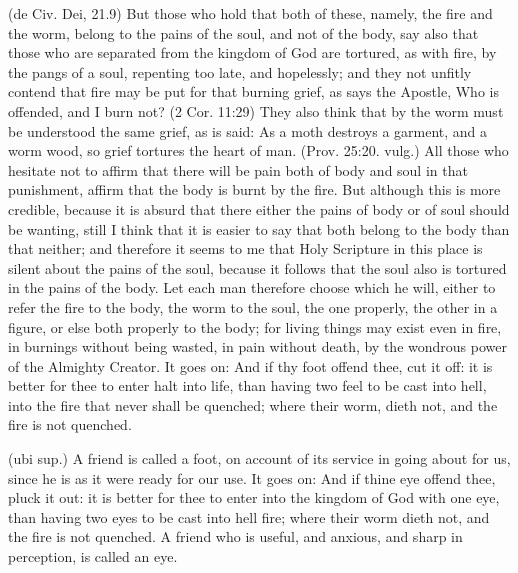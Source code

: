  (de Civ. Dei, 21.9) But those who hold that both of these, namely, the fire and the worm, belong to the pains of the soul, and not of the body, say also that those who are separated from the kingdom of God are tortured, as with fire, by the pangs of a soul, repenting too late, and hopelessly; and they not unfitly contend that fire may be put for that burning grief, as says the Apostle, Who is offended, and I burn not? (2 Cor. 11:29) They also think that by the worm must be understood the same grief, as is said: As a moth destroys a garment, and a worm wood, so grief tortures the heart of man. (Prov. 25:20. vulg.) All those who hesitate not to affirm that there will be pain both of body and soul in that punishment, affirm that the body is burnt by the fire. But although this is more credible, because it is absurd that there either the pains of body or of soul should be wanting, still I think that it is easier to say that both belong to the body than that neither; and therefore it seems to me that Holy Scripture in this place is silent about the pains of the soul, because it follows that the soul also is tortured in the pains of the body. Let each man therefore choose which he will, either to refer the fire to the body, the worm to the soul, the one properly, the other in a figure, or else both properly to the body; for living things may exist even in fire, in burnings without being wasted, in pain without death, by the wondrous power of the Almighty Creator. It goes on: And if thy foot offend thee, cut it off: it is better for thee to enter halt into life, than having two feel to be cast into hell, into the fire that never shall be quenched; where their worm, dieth not, and the fire is not quenched.

 (ubi sup.) A friend is called a foot, on account of its service in going about for us, since he is as it were ready for our use. It goes on: And if thine eye offend thee, pluck it out: it is better for thee to enter into the kingdom of God with one eye, than having two eyes to be cast into hell fire; where their worm dieth not, and the fire is not quenched. A friend who is useful, and anxious, and sharp in perception, is called an eye.

